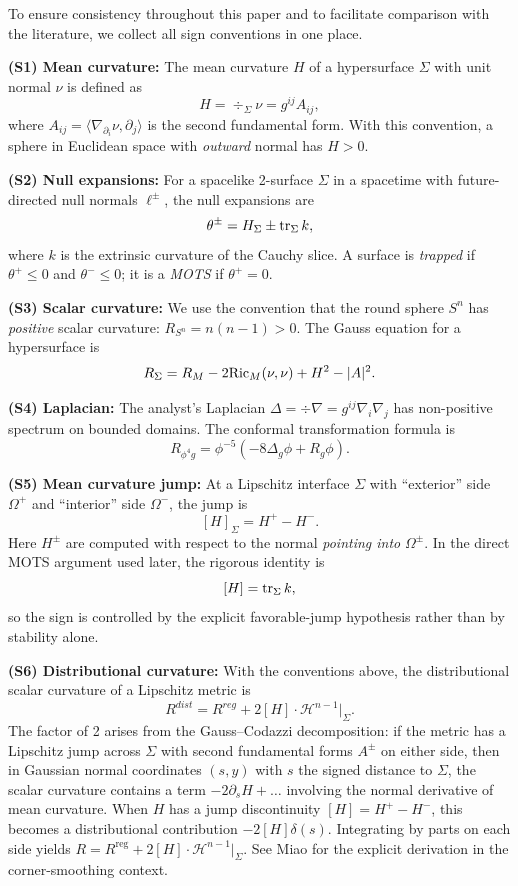 \begin{remark}\label{rem:SignConventionsSummary}
To ensure consistency throughout this paper and to facilitate comparison with the literature, we collect all sign conventions in one place.

\textbf{(S1) Mean curvature:}
The mean curvature $H$ of a hypersurface $\Sigma$ with unit normal $\nu$ is defined as
\[
    H = \div_\Sigma \nu = g^{ij} A_{ij},
\]
where $A_{ij} = \langle \nabla_{\partial_i} \nu, \partial_j \rangle$ is the second fundamental form. With this convention, a sphere in Euclidean space with \emph{outward} normal has $H > 0$.

\textbf{(S2) Null expansions:}
For a spacelike 2-surface $\Sigma$ in a spacetime with future-directed null normals $\ell^\pm$, the null expansions are
\[
    \theta^\pm = H_\Sigma \pm \operatorname{tr}_\Sigma k,
\]
where $k$ is the extrinsic curvature of the Cauchy slice. A surface is \emph{trapped} if $\theta^+ \le 0$ and $\theta^- \le 0$; it is a \emph{MOTS} if $\theta^+ = 0$.

\textbf{(S3) Scalar curvature:}
We use the convention that the round sphere $S^n$ has \emph{positive} scalar curvature: $R_{S^n} = n(n-1) > 0$. The Gauss equation for a hypersurface is
\[
    R_\Sigma = R_M - 2\mathrm{Ric}_M(\nu,\nu) + H^2 - |A|^2.
\]

\textbf{(S4) Laplacian:}
The analyst's Laplacian $\Delta = \div \nabla = g^{ij}\nabla_i\nabla_j$ has non-positive spectrum on bounded domains. The conformal transformation formula is
\[
    R_{\phi^4 g} = \phi^{-5}(-8\Delta_g \phi + R_g \phi).
\]

\textbf{(S5) Mean curvature jump:}
At a Lipschitz interface $\Sigma$ with ``exterior'' side $\Omega^+$ and ``interior'' side $\Omega^-$, the jump is
\[
    [H]_\Sigma = H^+ - H^-.
\]
Here $H^\pm$ are computed with respect to the normal \emph{pointing into} $\Omega^\pm$. In the direct MOTS argument used later, the rigorous identity is
\[
    [H] = \operatorname{tr}_\Sigma k,
\]
so the sign is controlled by the explicit favorable-jump hypothesis rather than by stability alone.

\textbf{(S6) Distributional curvature:}
With the conventions above, the distributional scalar curvature of a Lipschitz metric is
\[
    R^{dist} = R^{reg} + 2[H] \cdot \mathcal{H}^{n-1}|_\Sigma.
\]
The factor of 2 arises from the Gauss--Codazzi decomposition: if the metric has a Lipschitz jump across $\Sigma$ with second fundamental forms $A^\pm$ on either side, then in Gaussian normal coordinates $(s, y)$ with $s$ the signed distance to $\Sigma$, the scalar curvature contains a term $-2\partial_s H + \ldots$ involving the normal derivative of mean curvature. When $H$ has a jump discontinuity $[H] = H^+ - H^-$, this becomes a distributional contribution $-2 [H] \delta(s)$. Integrating by parts on each side yields $R = R^{\mathrm{reg}} + 2[H] \cdot \mathcal{H}^{n-1}|_\Sigma$. See Miao \cite{miao2002} for the explicit derivation in the corner-smoothing context.


\end{remark}
